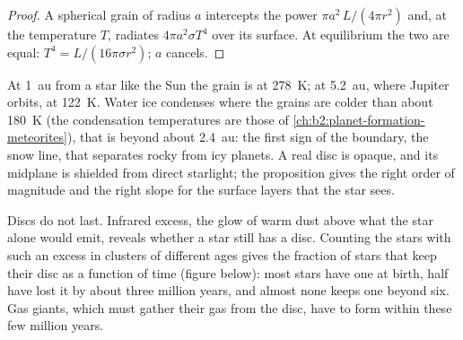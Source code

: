 \begin{proof}
A spherical grain of radius $a$ intercepts the power $\pi a^2\,L/(4\pi r^2)$
and, at the temperature $T$, radiates $4\pi a^2\sigma T^4$ over its surface.
At equilibrium the two are equal: $T^4 = L/(16\pi\sigma r^2)$; $a$ cancels.
\end{proof}

At \qty{1}{au} from a star like the Sun the grain is at \qty{278}{K}; at
\qty{5.2}{au}, where Jupiter orbits, at \qty{122}{K}. Water ice condenses where
the grains are colder than about \qty{180}{K} (the condensation temperatures are
those of \cref{ch:b2:planet-formation-meteorites}), that is beyond about
\qty{2.4}{au}: the first sign of the boundary, the snow line, that separates
rocky from icy planets. A real disc is opaque, and its midplane is shielded from direct starlight; the
proposition gives the right order of magnitude and the right slope for the
surface layers that the star sees.

Discs do not last. Infrared excess, the glow of warm dust above what the star
alone would emit, reveals whether a star still has a disc. Counting the stars
with such an excess in clusters of different ages gives the fraction of stars
that keep their disc as a function of time (figure below): most stars have one
at birth, half have lost it by about three million years, and almost none
keeps one beyond six. Gas giants, which must gather their gas from the disc,
have to form within these few million years.

